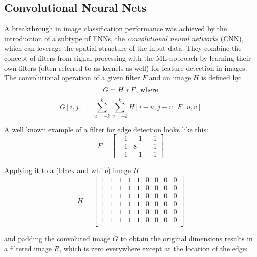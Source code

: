 \subsection{Convolutional Neural Nets}%
\label{sub:convolutional_neural_nets}

A breakthrough in image classification performance was achieved by the
introduction of a subtype of FNNs, the \emph{convolutional neural networks}
(CNN), which can leverage the spatial structure of the input data.  They
combine the concept of filters from signal processing with the ML approach by
learning their own filters (often referred to as kernels as well) for feature
detection in images.  The convolutional operation of a given filter $F$ and an
image $H$ is defined by:
\begin{equation}
  G = H * F \text{, where}\\
\end{equation}
\begin{equation}
  G[i,j] = \sum_{u=-k}^k \sum_{v=-k}^k H[i-u, j-v]F[u,v]
\end{equation}

A well known example of a filter for edge detection looks like this:
\begin{equation}
  F = \begin{bmatrix} 
    -1 & -1 & -1 \\ 
    -1 & 8  & -1 \\ 
    -1 & -1 & -1  
  \end{bmatrix}
\end{equation}

Applying it to a (black and white) image $H$
\begin{equation}
  H = \begin{bmatrix}
	  1 & 1 & 1 & 1 & 1 & 0 & 0 & 0 & 0\\
	  1 & 1 & 1 & 1 & 1 & 0 & 0 & 0 & 0\\
	  1 & 1 & 1 & 1 & 1 & 0 & 0 & 0 & 0\\
	  1 & 1 & 1 & 1 & 1 & 0 & 0 & 0 & 0\\
	  1 & 1 & 1 & 1 & 1 & 0 & 0 & 0 & 0\\
	  1 & 1 & 1 & 1 & 1 & 0 & 0 & 0 & 0\\
	\end{bmatrix}
\end{equation}

and padding the convoluted image $G$ to obtain the original dimensions results
in a filtered image $R$, which is zero everywhere except at the location of the
edge:

